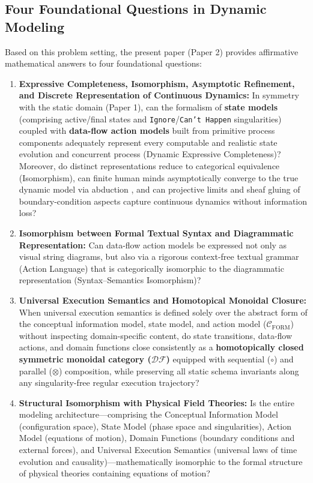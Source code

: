 \documentclass[11pt,a4paper]{article}
\theoremstyle{definition}
\theoremstyle{plain}
\theoremstyle{remark}
\newcommand{\DF}{\mathcal{DF}}
\newcommand{\Cform}{\mathcal{C}_{\mathrm{FORM}}}
\begin{document}
\subsection{Four Foundational Questions in Dynamic Modeling}
Based on this problem setting, the present paper (Paper 2) provides affirmative mathematical answers to four foundational questions:
\begin{enumerate}
    \item \textbf{Expressive Completeness, Isomorphism, Asymptotic Refinement, and Discrete Representation of Continuous Dynamics:} In symmetry with the static domain (Paper 1), can the formalism of \textbf{state models} (comprising active/final states and \texttt{Ignore}/\texttt{Can't Happen} singularities) coupled with \textbf{data-flow action models} built from primitive process components adequately represent every computable and realistic state evolution and concurrent process (Dynamic Expressive Completeness)? Moreover, do distinct representations reduce to categorical equivalence (Isomorphism), can finite human minds asymptotically converge to the true dynamic model via abduction \cite{peirce1903}, and can projective limits and sheaf gluing \cite{maclane1992} of boundary-condition aspects capture continuous dynamics without information loss?
    \item \textbf{Isomorphism between Formal Textual Syntax and Diagrammatic Representation:} Can data-flow action models be expressed not only as visual string diagrams, but also via a rigorous context-free textual grammar (Action Language) that is categorically isomorphic to the diagrammatic representation (Syntax--Semantics Isomorphism)?
    \item \textbf{Universal Execution Semantics and Homotopical Monoidal Closure:} When universal execution semantics is defined solely over the abstract form of the conceptual information model, state model, and action model ($\Cform$) without inspecting domain-specific content, do state transitions, data-flow actions, and domain functions close consistently as a \textbf{homotopically closed symmetric monoidal category ($\DF$)} equipped with sequential ($\circ$) and parallel ($\otimes$) composition, while preserving all static schema invariants along any singularity-free regular execution trajectory?
    \item \textbf{Structural Isomorphism with Physical Field Theories:} Is the entire modeling architecture---comprising the Conceptual Information Model (configuration space), State Model (phase space and singularities), Action Model (equations of motion), Domain Functions (boundary conditions and external forces), and Universal Execution Semantics (universal laws of time evolution and causality)---mathematically isomorphic to the formal structure of physical theories containing equations of motion?
\end{enumerate}
\end{document}
